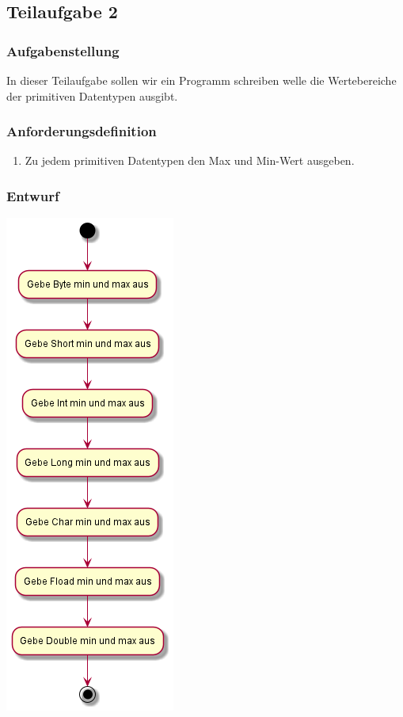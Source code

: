 \subsection{Teilaufgabe 2}
\subsubsection{Aufgabenstellung}
In dieser Teilaufgabe sollen wir ein Programm schreiben welle die Wertebereiche der primitiven
Datentypen ausgibt.

\subsubsection{Anforderungsdefinition}
\begin{enumerate}
	\item Zu jedem primitiven Datentypen den Max und Min-Wert ausgeben.
\end{enumerate}

\subsubsection{Entwurf}
\includegraphics[scale=0.75]{uml/uml_c3_p1.png}

